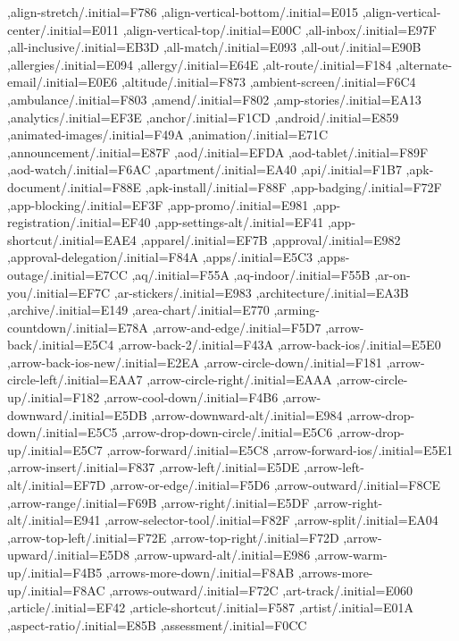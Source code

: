 { ,align-stretch/.initial=F786
 ,align-vertical-bottom/.initial=E015
 ,align-vertical-center/.initial=E011
 ,align-vertical-top/.initial=E00C
 ,all-inbox/.initial=E97F
 ,all-inclusive/.initial=EB3D
 ,all-match/.initial=E093
 ,all-out/.initial=E90B
 ,allergies/.initial=E094
 ,allergy/.initial=E64E
 ,alt-route/.initial=F184
 ,alternate-email/.initial=E0E6
 ,altitude/.initial=F873
 ,ambient-screen/.initial=F6C4
 ,ambulance/.initial=F803
 ,amend/.initial=F802
 ,amp-stories/.initial=EA13
 ,analytics/.initial=EF3E
 ,anchor/.initial=F1CD
 ,android/.initial=E859
 ,animated-images/.initial=F49A
 ,animation/.initial=E71C
 ,announcement/.initial=E87F
 ,aod/.initial=EFDA
 ,aod-tablet/.initial=F89F
 ,aod-watch/.initial=F6AC
 ,apartment/.initial=EA40
 ,api/.initial=F1B7
 ,apk-document/.initial=F88E
 ,apk-install/.initial=F88F
 ,app-badging/.initial=F72F
 ,app-blocking/.initial=EF3F
 ,app-promo/.initial=E981
 ,app-registration/.initial=EF40
 ,app-settings-alt/.initial=EF41
 ,app-shortcut/.initial=EAE4
 ,apparel/.initial=EF7B
 ,approval/.initial=E982
 ,approval-delegation/.initial=F84A
 ,apps/.initial=E5C3
 ,apps-outage/.initial=E7CC
 ,aq/.initial=F55A
 ,aq-indoor/.initial=F55B
 ,ar-on-you/.initial=EF7C
 ,ar-stickers/.initial=E983
 ,architecture/.initial=EA3B
 ,archive/.initial=E149
 ,area-chart/.initial=E770
 ,arming-countdown/.initial=E78A
 ,arrow-and-edge/.initial=F5D7
 ,arrow-back/.initial=E5C4
 ,arrow-back-2/.initial=F43A
 ,arrow-back-ios/.initial=E5E0
 ,arrow-back-ios-new/.initial=E2EA
 ,arrow-circle-down/.initial=F181
 ,arrow-circle-left/.initial=EAA7
 ,arrow-circle-right/.initial=EAAA
 ,arrow-circle-up/.initial=F182
 ,arrow-cool-down/.initial=F4B6
 ,arrow-downward/.initial=E5DB
 ,arrow-downward-alt/.initial=E984
 ,arrow-drop-down/.initial=E5C5
 ,arrow-drop-down-circle/.initial=E5C6
 ,arrow-drop-up/.initial=E5C7
 ,arrow-forward/.initial=E5C8
 ,arrow-forward-ios/.initial=E5E1
 ,arrow-insert/.initial=F837
 ,arrow-left/.initial=E5DE
 ,arrow-left-alt/.initial=EF7D
 ,arrow-or-edge/.initial=F5D6
 ,arrow-outward/.initial=F8CE
 ,arrow-range/.initial=F69B
 ,arrow-right/.initial=E5DF
 ,arrow-right-alt/.initial=E941
 ,arrow-selector-tool/.initial=F82F
 ,arrow-split/.initial=EA04
 ,arrow-top-left/.initial=F72E
 ,arrow-top-right/.initial=F72D
 ,arrow-upward/.initial=E5D8
 ,arrow-upward-alt/.initial=E986
 ,arrow-warm-up/.initial=F4B5
 ,arrows-more-down/.initial=F8AB
 ,arrows-more-up/.initial=F8AC
 ,arrows-outward/.initial=F72C
 ,art-track/.initial=E060
 ,article/.initial=EF42
 ,article-shortcut/.initial=F587
 ,artist/.initial=E01A
 ,aspect-ratio/.initial=E85B
 ,assessment/.initial=F0CC
}
